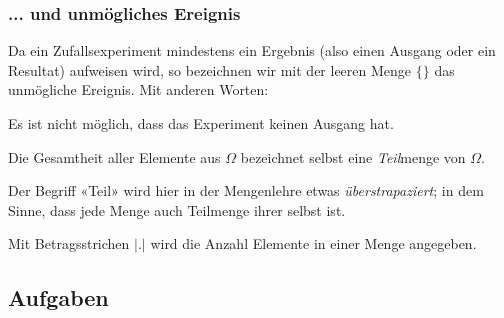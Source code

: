 \subsubsection{... und unmögliches Ereignis}
Da ein Zufallsexperiment mindestens ein Ergebnis (also einen Ausgang
oder ein Resultat) aufweisen wird, so bezeichnen wir mit der leeren
Menge $\{\}$ das unmögliche Ereignis. Mit anderen Worten:

Es ist nicht möglich, dass das Experiment keinen Ausgang hat.


\begin{bemerkung}{}{}
Die Gesamtheit aller Elemente aus $\Omega$ bezeichnet selbst eine
\textit{Teil}menge von $\Omega$.

Der Begriff «Teil» wird hier in der Mengenlehre etwas \textit{überstrapaziert}; in dem Sinne, dass jede Menge auch
  Teilmenge ihrer selbst ist.
\end{bemerkung}

\begin{definition}{}{}
Mit Betragsstrichen $|.|$ wird die Anzahl Elemente in einer Menge angegeben.
\end{definition}

\subsection*{Aufgaben}

\newpage

